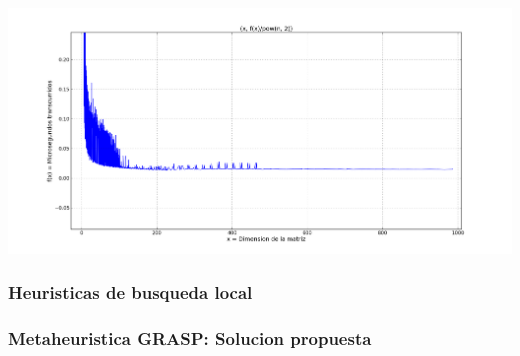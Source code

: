 \begin{center}
\includegraphics[scale=0.40]{img/golosa_fx2.png}
\end{center}
\vspace{2mm}

\subsubsection{Heuristicas de busqueda local}
\subsubsection{Metaheuristica GRASP: Solucion propuesta}
